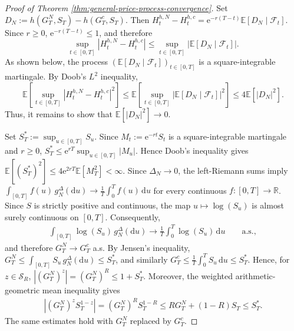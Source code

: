\documentclass[10pt,a4paper,reqno]{amsart}
\theoremstyle{plain}
\theoremstyle{definition}
\theoremstyle{remark}
\theoremstyle{example}
\begin{document}
\begin{proof}[Proof of Theorem \ref{thm:general-price-process-convergence}]
    Set $D_N := h(G_T^N,S_T)-h(G_T^c,S_T)$. Then $H_t^{h,N}-H_t^{h,c} = \mathrm e^{-r(T-t)} \mathbb E[D_N\mid\mathcal F_t]$. Since $r\geq0$, $\mathrm e^{-r(T-t)}\leq1$, and therefore
    \[
        \sup_{t\in[0,T]} |H_t^{h,N}-H_t^{h,c}| \leq \sup_{t\in[0,T]} \left| \mathbb E[D_N\mid\mathcal F_t] \right|.
    \]
    As shown below, the process $\left( \mathbb E[D_N\mid\mathcal F_t] \right)_{t\in[0,T]}$ is a square-integrable martingale. By Doob's $L^2$ inequality,
    \[
        \mathbb E\left[ \sup_{t\in[0,T]} |H_t^{h,N}-H_t^{h,c}|^2 \right] \leq \mathbb E\left[ \sup_{t\in[0,T]} \left| \mathbb E[D_N\mid\mathcal F_t] \right|^2 \right]
        \leq 4\mathbb E[|D_N|^2].
    \]
    Thus, it remains to show that $\mathbb E[|D_N|^2]\longrightarrow0$. 

    Set $S_T^*:=\sup_{u\in[0,T]}S_u$. Since $M_t:=\mathrm e^{-rt}S_t$ is a square-integrable martingale and $r\geq0$, $S_T^* \leq \mathrm e^{rT}\sup_{u\in[0,T]}|M_u|$. Hence Doob's inequality gives $\mathbb E[(S_T^*)^2] \leq 4\mathrm e^{2rT}\mathbb E[M_T^2] < \infty$. Since $\Delta_N\to0$, the left-Riemann sums imply $\int_{[0,T]}f(u)\,g_N^\Delta(\mathrm du) \longrightarrow \frac1T\int_0^Tf(u)\,\mathrm du$ for every continuous $f:[0,T]\longrightarrow \mathbb R$. Since $S$ is strictly positive and continuous, the map $u\mapsto\log(S_u)$ is almost surely continuous on $[0,T]$. Consequently,
    \begin{align} \label{eq: 1}
        \int_{[0,T]}\log(S_u)\,g_N^\Delta(\mathrm du) \longrightarrow  \frac1T\int_0^T\log(S_u)\,\mathrm du \qquad\text{a.s.},
    \end{align}
    and therefore $G_T^N\longrightarrow G_T^c$ a.s. By Jensen's inequality, $G_T^N \leq \int_{[0,T]}S_u\,g_N^\Delta(\mathrm du) \leq S_T^*$, and similarly $G_T^c \leq \frac1T\int_0^TS_u\,\mathrm du \leq S_T^*$. Hence, for $z\in\mathcal S_R$, $|(G_T^N)^z| = (G_T^N)^R \leq 1+S_T^*$. Moreover, the weighted arithmetic-geometric mean inequality gives
    \begin{align*}
        |(G_T^N)^zS_T^{1-z}| = (G_T^N)^R S_T^{1-R} \leq R G_T^N+(1-R)S_T \leq S_T^*.
    \end{align*}
    The same estimates hold with $G_T^N$ replaced by $G_T^c$.


\end{proof}
\end{document}
